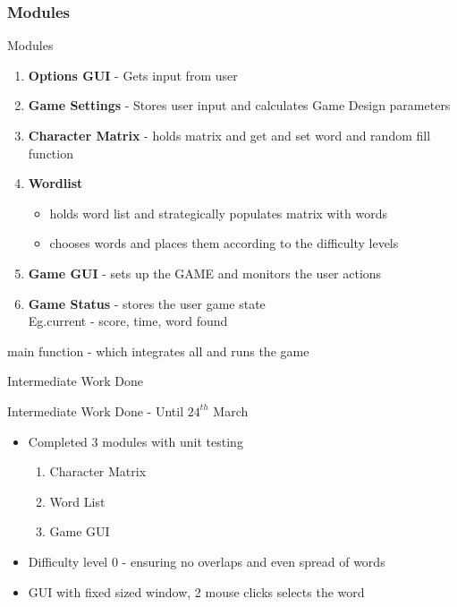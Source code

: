 \documentclass[handout]{beamer}%
\begin{document}
\begin{frame}\frametitle {Modules}
\begin{block}{Modules}
\begin{enumerate} 
\item \textbf{Options GUI} - Gets input from user
\item \textbf{Game Settings} - Stores user input and calculates Game Design parameters 
\item \textbf{Character Matrix} - holds matrix and get and set word and random fill function
\item \textbf{Wordlist}
\begin{itemize} \item holds word list and strategically populates matrix with words  \item  chooses words and places them according to the difficulty levels \end{itemize}
\item \textbf{Game GUI} - sets up the GAME and monitors the user actions
\item \textbf{Game Status} - stores the user game state \\Eg.current - score, time, word found
\end{enumerate}
main function - which integrates all and runs the game
\end{block}
\end{frame}

\begin{frame}{Intermediate Work Done}

\begin{block}{Intermediate Work Done - Until $24^{th}$ March}
\begin{itemize}
\item Completed 3 modules with unit testing
\begin{enumerate}
\item Character Matrix
\item Word List 
\item Game GUI
\end{enumerate}
\item Difficulty level 0 - ensuring no overlaps and even spread of words
\item GUI with fixed sized window, 2 mouse clicks selects the word  
 \end{itemize}
\end{block}
\end{frame}
\end{document}

